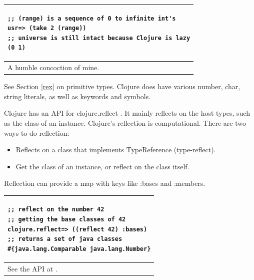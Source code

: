 \documentclass[12pt]{article}
\begin{document}
\begin{tabular}{|p{}|}
\hline
\begin{verbatim}
;; (range) is a sequence of 0 to infinite int's
usr=> (take 2 (range))
;; universe is still intact because Clojure is lazy
(0 1)
\end{verbatim}
\\
\hline
A humble concoction of mine.
\\
\hline
\end{tabular}




See Section \ref{rex} on primitive types. Clojure does have various number, char, string literals, as well as keywords and symbols.




Clojure has an API for clojure.reflect \cite{reflect}. It mainly reflects on the host types, such as the class of an instance. Clojure's reflection is computational. There are two ways to do reflection: 

\begin{itemize}
\item Reflects on a class that implements TypeReference (type-reflect).
\item Get the class of an instance, or reflect on the class itself.
\end{itemize}

Reflection can provide a map with keys like :bases and :members.

\begin{tabular}{|p{}|}
\hline
\begin{verbatim}
;; reflect on the number 42
;; getting the base classes of 42
clojure.reflect=> ((reflect 42) :bases)
;; returns a set of java classes
#{java.lang.Comparable java.lang.Number}
\end{verbatim}
\\
\hline
See the API at \cite{reflect}.
\\
\hline
\end{tabular}


\end{document}
